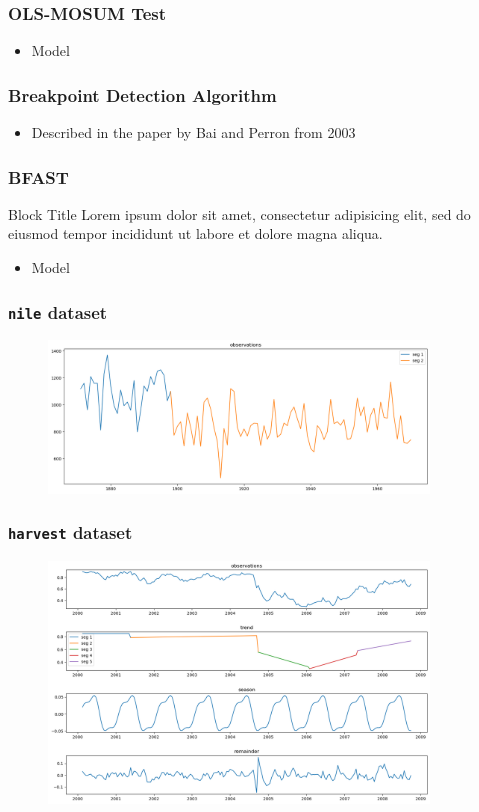 \documentclass[9pt]{beamer}
\begin{document}
\begin{frame}
\frametitle{OLS-MOSUM Test}
\begin{itemize}
  \item Model
\end{itemize}
\end{frame}

\begin{frame}
\frametitle{Breakpoint Detection Algorithm}
\begin{itemize}
  \item Described in the paper by Bai and Perron from 2003
\end{itemize}
\end{frame}

\begin{frame}
\frametitle{BFAST}
\begin{block}{Block Title}
Lorem ipsum dolor sit amet, consectetur adipisicing elit, 
sed do eiusmod tempor incididunt ut labore et 
dolore magna aliqua.
\end{block}
\begin{itemize}
  \item Model
\end{itemize}
\end{frame}

\begin{frame}
\frametitle{\texttt{nile} dataset}
\begin{figure}[H]
  \centering
  \includegraphics[width=0.9\textwidth]{imgs/nile.png}
\end{figure}
\end{frame}

\begin{frame}
\frametitle{\texttt{harvest} dataset}
\begin{figure}[H]
  \centering
  \includegraphics[width=0.9\textwidth]{imgs/harvest.png}
\end{figure}
\end{frame}
\end{document}
